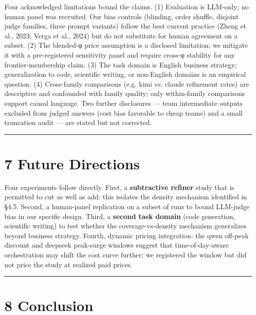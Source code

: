 \documentclass[11pt,a4paper]{article}
\begin{document}
Four acknowledged limitations bound the claims. (1) Evaluation is
LLM-only; no human panel was recruited. Our bias controls (blinding,
order shuffle, disjoint judge families, three prompt variants) follow
the best current practice (Zheng et al., 2023; Verga et al., 2024)
but do not substitute for human agreement on a subset. (2) The
blended-φ price assumption is a disclosed limitation; we mitigate it
with a pre-registered sensitivity panel and require cross-φ stability
for any frontier-membership claim. (3) The task domain is English
business strategy; generalization to code, scientific writing, or
non-English domains is an empirical question. (4) Cross-family
comparisons (e.g. kimi vs. claude refinement rates) are descriptive
and confounded with family quality; only within-family comparisons
support causal language. Two further disclosures — team intermediate
outputs excluded from judged answers (cost bias favorable to cheap
teams) and a small truncation audit — are stated but not corrected.

\hrule


\section{7 Future Directions}

Four experiments follow directly. First, a \textbf{subtractive refiner}
study that is permitted to cut as well as add: this isolates the
density mechanism identified in §4.5. Second, a \textit{}human-panel
replication\textit{} on a subset of runs to bound LLM-judge bias in our
specific design. Third, a \textbf{second task domain} (code generation,
scientific writing) to test whether the coverage-vs-density
mechanism generalizes beyond business strategy. Fourth, \textit{}dynamic
pricing integration\textit{}: the qwen off-peak discount and deepseek
peak-surge windows suggest that time-of-day-aware orchestration may
shift the cost curve further; we registered the window but did not
price the study at realized paid prices.

\hrule


\section{8 Conclusion}
\end{document}
